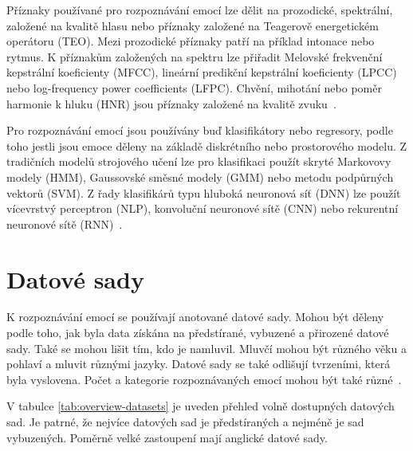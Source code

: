 \documentclass[FM,BP]{tulthesis}
\begin{document}
Příznaky používané pro rozpoznávání emocí lze dělit na prozodické, spektrální, založené na kvalitě hlasu nebo příznaky založené na Teagerově energetickém operátoru (TEO). Mezi prozodické příznaky patří na příklad intonace nebo rytmus. K příznakům založených na spektru lze přiřadit Melovské frekvenční kepstrální koeficienty (MFCC), lineární predikční kepstrální koeficienty (LPCC) nebo log-frequency power coeﬀicients (LFPC). Chvění, mihotání nebo poměr harmonie k hluku (HNR) jsou příznaky založené na kvalitě zvuku~\cite{DBLP:journals/speech/AkcayO20}.

Pro rozpoznávání emocí jsou používány buď klasifikátory nebo regresory, podle toho jestli jsou emoce děleny na základě diskrétního nebo prostorového modelu. Z tradičních modelů strojového učení lze pro klasifikaci použít skryté Markovovy modely (HMM), Gaussovské směsné modely (GMM) nebo metodu podpůrných vektorů (SVM). Z řady klasifikárů typu hluboká neuronová síť (DNN) lze použít vícevrstvý perceptron (NLP), konvoluční neuronové sítě (CNN) nebo rekurentní neuronové sítě (RNN)~\cite{DBLP:journals/speech/AkcayO20}.

\chapter{Datové sady} %
K rozpoznávání emocí se používají anotované datové sady. Mohou být děleny podle toho, jak byla data získána na předstírané, vybuzené a přirozené datové sady. Také se mohou lišit tím, kdo je namluvil. Mluvčí mohou být různého věku a pohlaví a mluvit různými jazyky. Datové sady se také odlišují tvrzeními, která byla vyslovena. Počet a kategorie rozpoznávaných emocí mohou být také různé~\cite{DBLP:journals/speech/AkcayO20}.

V tabulce \ref{tab:overview-datasets} je uveden přehled volně dostupných datových sad. Je patrné, že nejvíce datových sad je předstíraných a nejméně je sad vybuzených. Poměrně velké zastoupení mají anglické datové sady.
\end{document}
